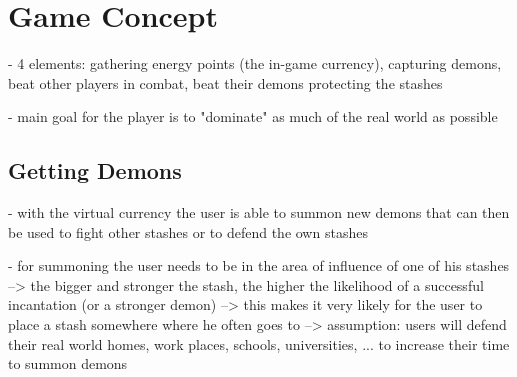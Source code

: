\section{Game Concept}
\label{sec:concept}




- 4 elements: gathering energy points (the in-game currency), capturing demons, beat other players in combat, beat their demons protecting the stashes

- main goal for the player is to "dominate" as much of the real world as possible



\subsection{Getting Demons}
\label{subsec:demons}

- with the virtual currency the user is able to summon new demons that can then be used to fight other stashes or to defend the own stashes

- for summoning the user needs to be in the area of influence of one of his stashes --> the bigger and stronger the stash, the higher the likelihood of a successful incantation (or a stronger demon)
--> this makes it very likely for the user to place a stash somewhere where he often goes to 
--> assumption: users will defend their real world homes, work places, schools, universities, ... to increase their time to summon demons

